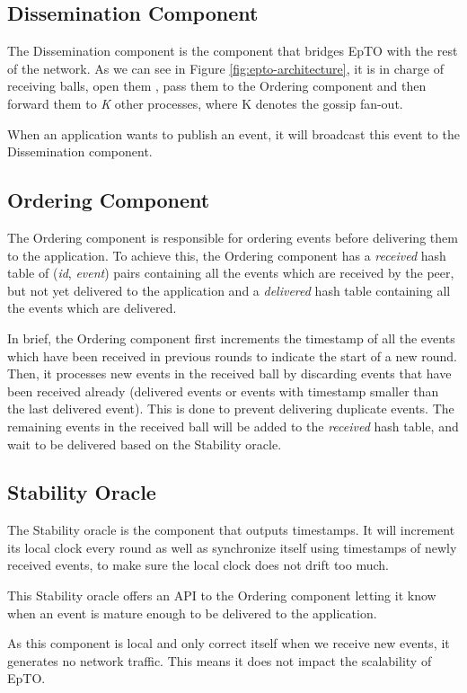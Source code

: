 \documentclass[10pt,conference,a4paper]{IEEEtran}
\begin{document}
\subsection{Dissemination Component}
The Dissemination component is the component that bridges EpTO with the rest of the network. As we can see in Figure \ref*{fig:epto-architecture}, it is in charge of receiving balls, open them , pass them to the Ordering component and then forward them to \textit{K} other processes, where K denotes the gossip fan-out.
\par
When an application wants to publish an event, it will broadcast this event to the Dissemination component.

\subsection{Ordering Component}
The Ordering component is responsible for ordering events before delivering them to the application.
To achieve this, the Ordering component has a \textit{received} hash table of (\textit{id}, \textit{event}) pairs containing all the events which are received by the peer, but not yet delivered to the application and a \textit{delivered} hash table containing all the events which are delivered.
\par
In brief, the Ordering component first increments the timestamp of all the events which have been received in previous rounds to indicate the start of a new round. Then, it processes new events in the received ball by discarding events that have been received already (delivered events or events with timestamp smaller than the last delivered event). This is done to prevent delivering duplicate events. The remaining events in the received ball will be added to the \textit{received} hash table, and wait to be delivered based on the Stability oracle.
\subsection{Stability Oracle}
The Stability oracle is the component that outputs timestamps. It will increment its local clock every round as well as synchronize itself using timestamps of newly received events, to make sure the local clock does not drift too much.
\par
This Stability oracle offers an API to the Ordering component letting it know when an event is mature enough to be delivered to the application.
\par
As this component is local and only correct itself when we receive new events, it generates no network traffic. This means it does not impact the scalability of EpTO.
\end{document}

